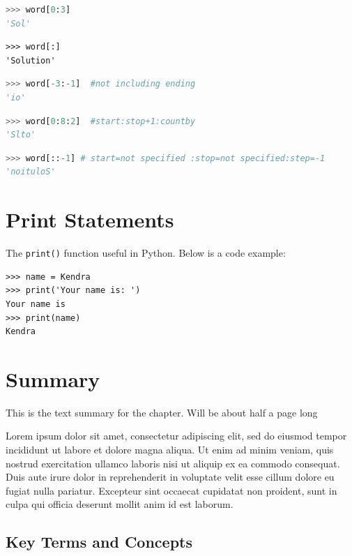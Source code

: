 \documentclass{book}
\begin{document}
    \begin{lstlisting}[language=Python]
>>> word[0:3]
'Sol'
\end{lstlisting}

    \begin{lstlisting}
>>> word[:]
'Solution'
\end{lstlisting}

    \begin{lstlisting}[language=Python]
>>> word[-3:-1]  #not including ending
'io'
\end{lstlisting}

    \begin{lstlisting}[language=Python]
>>> word[0:8:2]  #start:stop+1:countby
'Slto'
\end{lstlisting}

    \begin{lstlisting}[language=Python]
>>> word[::-1] # start=not specified :stop=not specified:step=-1
'noituloS'
\end{lstlisting}

    \section{Print Statements}\label{print-statements}

    The \lstinline!print()! function useful in Python. Below is a code
example:

\begin{lstlisting}
>>> name = Kendra
>>> print('Your name is: ')
Your name is
>>> print(name)
Kendra
\end{lstlisting}

    \section{Summary}\label{summary}

    This is the text summary for the chapter. Will be about half a page long

Lorem ipsum dolor sit amet, consectetur adipiscing elit, sed do eiusmod
tempor incididunt ut labore et dolore magna aliqua. Ut enim ad minim
veniam, quis nostrud exercitation ullamco laboris nisi ut aliquip ex ea
commodo consequat. Duis aute irure dolor in reprehenderit in voluptate
velit esse cillum dolore eu fugiat nulla pariatur. Excepteur sint
occaecat cupidatat non proident, sunt in culpa qui officia deserunt
mollit anim id est laborum.

    \subsection{Key Terms and Concepts}\label{key-terms-and-concepts}
\end{document}
